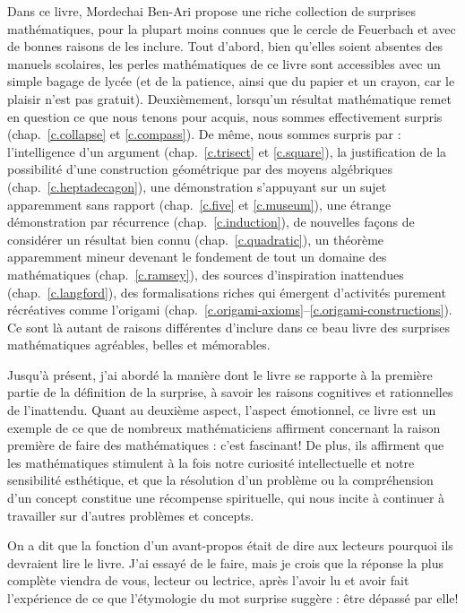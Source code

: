 Dans ce livre, Mordechai Ben-Ari propose une riche collection de surprises mathématiques, pour la plupart moins connues que le cercle de Feuerbach et avec de bonnes raisons de les inclure. Tout d'abord, bien qu'elles soient absentes des manuels scolaires, les perles mathématiques de ce livre sont accessibles avec un simple bagage de lycée (et de la patience, ainsi que du papier et un crayon, car le plaisir n'est pas gratuit). Deuxièmement, lorsqu'un résultat mathématique remet en question ce que nous tenons pour acquis, nous sommes effectivement surpris (chap.~\ref{c.collapse} et  \ref{c.compass}). De même, nous sommes surpris par : l'intelligence d'un argument (chap.~\ref{c.trisect} et \ref{c.square}), la justification de la possibilité d'une construction géométrique par des moyens algébriques (chap.~\ref{c.heptadecagon}), une démonstration s'appuyant sur un sujet apparemment sans rapport (chap.~\ref{c.five}  et \ref{c.museum}), une étrange démonstration par récurrence  (chap.~\ref{c.induction}), de nouvelles façons de considérer un résultat bien connu (chap.~\ref{c.quadratic}), un théorème apparemment mineur devenant le fondement de tout un domaine des mathématiques (chap.~\ref{c.ramsey}), des sources d'inspiration inattendues (chap.~\ref{c.langford}), des formalisations riches qui émergent d'activités purement récréatives comme l'origami (chap.~\ref{c.origami-axioms}--\ref{c.origami-constructions}). Ce sont là autant de raisons différentes d'inclure dans ce beau livre des surprises mathématiques agréables, belles et mémorables.
   
Jusqu'à présent, j'ai abordé la manière dont le livre se rapporte à la première partie de la définition de la surprise, à savoir les raisons cognitives et rationnelles de l'inattendu. Quant au deuxième aspect, l'aspect émotionnel, ce livre est un exemple  de ce que de nombreux mathématiciens affirment concernant la raison première de faire des mathématiques : c'est fascinant! De plus, ils affirment que les mathématiques stimulent à la fois notre curiosité intellectuelle et notre sensibilité esthétique, et que la résolution d'un problème ou la compréhension d'un concept constitue une récompense spirituelle, qui nous incite à continuer à travailler sur d'autres problèmes et concepts. 

On a dit que la fonction d'un avant-propos était de dire aux lecteurs pourquoi ils devraient lire le livre. J'ai essayé de le faire, mais je crois que la réponse la plus complète viendra de vous, lecteur ou lectrice, après l'avoir lu et avoir fait l'expérience de ce que l'étymologie du mot \og surprise\fg{} suggère : être dépassé par elle!



